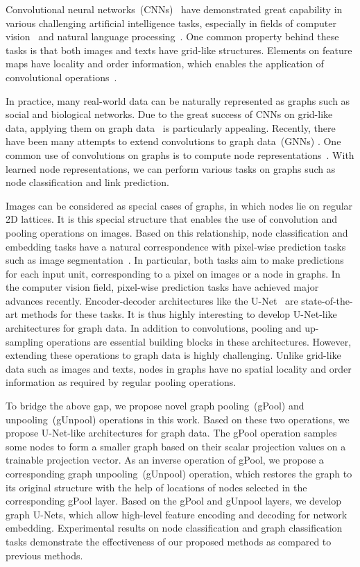 \documentclass{article}
\begin{document}
Convolutional neural networks~(CNNs)~\citep{lecun2012efficient} have
demonstrated great capability in various challenging artificial
intelligence tasks, especially in fields of computer
vision~\citep{he2017mask,huang2016densely} and natural language
processing~\citep{bahdanau2014neural}. One
common property behind these tasks is that both images and texts
have grid-like structures. Elements on feature maps have locality
and order information, which enables the application of
convolutional operations~\citep{defferrard2016convolutional}.

In practice, many real-world data can be naturally represented as graphs such
as social and biological networks. Due to the great success of CNNs on
grid-like data, applying them on graph data~\citep{gori2005new,scarselli2009graph}
is particularly appealing. Recently, there have been many attempts to extend
convolutions to graph data~(GNNs)
\citep{kipf2016semi,velivckovic2017graph,gao2018large}. One common use of
convolutions on graphs is to compute node
representations~\citep{hamilton2017inductive,ying2018hierarchical}. With
learned node representations, we can perform various tasks on graphs such as
node classification and link prediction.

Images can be considered as special cases of graphs, in which nodes
lie on regular 2D lattices. It is this special structure that
enables the use of convolution and pooling operations on images.
Based on this relationship, node classification and embedding tasks
have a natural correspondence with pixel-wise prediction tasks such
as image segmentation~\citep{noh2015learning,gao2017efficient,jegou2017one}. In
particular, both tasks aim to make predictions for each input unit,
corresponding to a pixel on images or a node in graphs.
In the computer vision field, pixel-wise prediction tasks have
achieved major advances recently. Encoder-decoder architectures like
the U-Net~\citep{ronneberger2015u} are state-of-the-art methods for
these tasks. It is thus highly interesting to develop U-Net-like
architectures for graph data. In addition to convolutions, pooling
and up-sampling operations are essential building blocks in these
architectures. However, extending these operations to graph data is
highly challenging. Unlike grid-like data such as images and texts,
nodes in graphs have no spatial locality and order information as
required by regular pooling operations.

To bridge the above gap, we propose novel graph pooling~(gPool) and
unpooling~(gUnpool) operations in this work. Based on these two
operations, we propose U-Net-like architectures for graph data. The
gPool operation samples some nodes to form a smaller graph based on
their scalar projection values on a trainable projection vector. As
an inverse operation of gPool, we propose a corresponding graph
unpooling~(gUnpool) operation, which restores the graph to its
original structure with the help of locations of nodes selected in
the corresponding gPool layer. Based on the gPool and gUnpool
layers, we develop graph U-Nets, which allow high-level feature
encoding and decoding for network embedding. Experimental results on node
classification and graph classification tasks
demonstrate the effectiveness of our proposed methods as compared to
previous methods.
\end{document}
